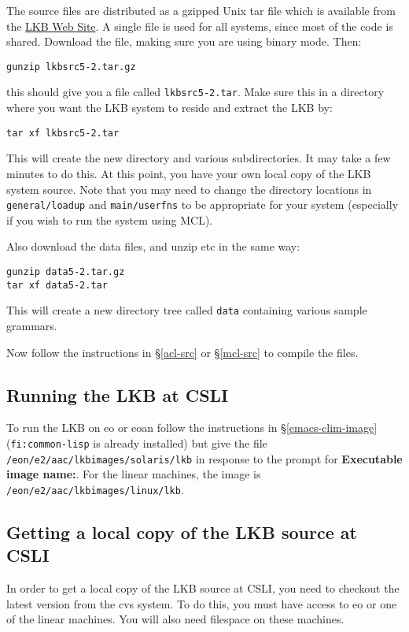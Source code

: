 \documentclass[12pt]{report}
\newcommand{\filename}[1]{{\tt #1}}
\newcommand{\functionname}[1]{{\tt #1}}
\begin{document}
The source files are distributed as a 
gzipped Unix tar file which is available from the
\href{http://www-csli.stanford.edu/~aac/lkb.html}{LKB Web Site}.
A single file is used for all systems, since most of the code is shared.
Download the file, making sure you are using binary mode.
Then:
\begin{verbatim}
gunzip lkbsrc5-2.tar.gz
\end{verbatim}
this should give you a file called \filename{lkbsrc5-2.tar}.  
Make sure this in a directory where you want the LKB system to reside
and extract the LKB by:
\begin{verbatim}
tar xf lkbsrc5-2.tar
\end{verbatim}
This will create the new directory and various subdirectories.
It may take a few minutes to do this.  At this point, you have 
your own local copy of the LKB system source.  Note that
you may need to change the directory locations in \filename{general/loadup}
and \filename{main/userfns}
to be appropriate for your system
(especially if you wish to run the system using MCL).

Also download the data files, and unzip etc in the same way:
\begin{verbatim}
gunzip data5-2.tar.gz
tar xf data5-2.tar
\end{verbatim}
This will create a new directory tree called \filename{data} containing
various sample grammars.

Now follow the instructions in \S\ref{acl-src} or \S\ref{mcl-src}
to compile the files.

\subsection{Running the LKB at CSLI}
\label{run-csli}

To run the LKB on eo or eoan
follow the instructions in \S\ref{emacs-clim-image} 
(\functionname{fi:common-lisp} is already installed)
but give the file \filename{/eon/e2/aac/lkbimages/solaris/lkb} in response
to the prompt for {\bf Executable image name:}.
For the linear machines, the image is\\
\filename{/eon/e2/aac/lkbimages/linux/lkb}.

\subsection{Getting a local copy of the LKB source at CSLI}
\label{down-csli}

In order to get a local copy of the LKB source at CSLI, you need to
checkout the latest version from the cvs system.  To do this,
you must have access to eo or one of the linear machines.  
You will also need filespace
on these machines.
\end{document}
